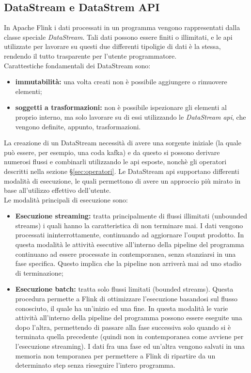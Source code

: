 \subsection{DataStream e DataStrem API}
In Apache Flink i dati processati in un programma vengono rappresentati dalla classe speciale \textit{DataStream}.
Tali dati possono essere finiti o illimitati, e le \gls{api} utilizzate per lavorare su questi due differenti tipoligie di dati è la stessa, rendendo il tutto trasparente per l'utente programmatore.\\
Carattestiche fondamentali dei DataStream sono:
\begin{itemize}
	\item{\textbf{immutabilità:} una volta creati non è possibile aggiungere o rimuovere elementi;}
	\item{\textbf{soggetti a trasformazioni:} non è possibile ispezionare gli elementi al proprio interno, ma solo lavorare su di essi utilizzando le \textit{DataStream \gls{api}}, che vengono definite, appunto, trasformazioni.}
\end{itemize}
La creazione di un DataStream necessità di avere una sorgente iniziale (la quale può essere, per esempio, una coda \gls{kafka}) e da questo si possono derivare numerosi flussi e combinarli utilizzando le \gls{api} esposte, nonchè gli operatori descritti nella sezione \S\ref{sec:operatori}.
Le DataStream \gls{api} supportano differenti modalità di esecuzione, le quali permettono di avere un approccio più mirato in base all'utilizzo effettivo dell'utente.\\
Le modalità principali di esecuzione sono:
\begin{itemize}
	\item{\textbf{Esecuzione streaming:} tratta principalmente di flussi illimitati (\gls{unbounded streams}) i quali hanno la caratteristica di non terminare mai. I dati vengono processati ininterrottamente, continuando ad aggiornare l'ouput prodotto. In questa modalità le attività esecutive all'interno della \gls{pipeline} del programma continuano ad essere processate in contemporanea, senza stanziarsi in una fase specifica. Questo implica che la \gls{pipeline} non arriverà mai ad uno stadio di terminazione;}
	\item{\textbf{Esecuzione batch:} tratta solo flussi limitati (\gls{bounded streams}). Questa procedura permette a Flink di ottimizzare l'esecuzione basandosi sul flusso conosciuto, il quale ha un'inizio ed una fine. In questa modalità le varie attività all'interno della \gls{pipeline} del programma possono essere eseguite una dopo l'altra, permettendo di passare alla fase successiva solo quando si è terminata quella precedente (quindi non in contemporanea come avviene per l'esecuzione streaming). I dati fra una fase ed un'altra vengono salvati in una memoria non temporanea per permettere a Flink di ripartire da un determinato step senza rieseguire l'intero programma.}
\end{itemize}

